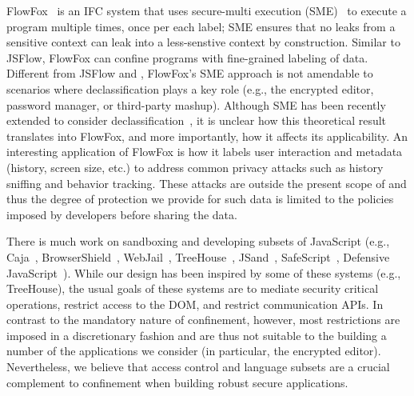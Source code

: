 FlowFox~\cite{DeGroef:2012} is an IFC system that uses secure-multi
execution (SME)~\cite{Devriese:2010} to execute a program multiple
times, once per each label; SME ensures that no leaks from a sensitive
context can leak into a less-senstive context by construction.
%
Similar to JSFlow, FlowFox can confine programs
with fine-grained labeling of data.
%
Different from JSFlow and \sys{}, FlowFox's SME approach is not
amendable to scenarios where declassification plays
a key role (e.g., the encrypted editor, password manager, or
third-party mashup). 
%
Although SME has been recently extended to consider
declassification~\cite{Rafnsson:2013}, it is unclear how this
theoretical result translates into FlowFox, and more importantly, how
it affects its applicability.
%
An interesting application of FlowFox is how it labels user interaction and metadata
(history, screen size, etc.) to address common privacy attacks such as
history sniffing and behavior tracking.
%
These attacks are outside the present scope of \sys{} and thus the
degree of protection we provide for such data is limited to the
policies imposed by developers before sharing the data.

%



There is much work on sandboxing and developing subsets of JavaScript (e.g.,
Caja~\cite{GoogleCaja}, BrowserShield~\cite{Reis:2007},
WebJail~\cite{VanAcker:2011}, TreeHouse~\cite{Ingram:2012},
JSand~\cite{Agten:2012:JCC}, SafeScript~\cite{SafeScript}, Defensive
JavaScript~\cite{djs}). 
%
While our design has been inspired by some of these systems (e.g., TreeHouse), the
usual goals of these systems are to mediate security
critical operations, restrict access to the DOM, and restrict communication APIs\@.
%
In contrast to the mandatory nature of confinement, however, most restrictions
are imposed in a discretionary fashion and are thus not suitable to the
building a number of the applications we consider (in particular, the encrypted
editor).
%
Nevertheless, we believe that access control and language subsets are a crucial
complement to confinement when building robust secure applications.



